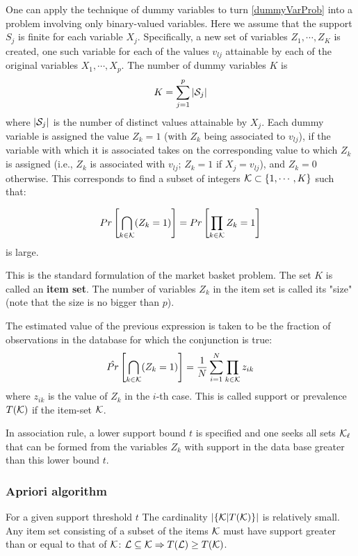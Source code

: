 \documentclass[12pt, letterpaper]{article}
\theoremstyle{definition}
\DeclarePairedDelimiter\autobracket{(}{)}
\newcommand{\br}[1]{\autobracket*{#1}}
\begin{document}
One can apply the technique of dummy variables to turn \autoref{dummyVarProb} into a problem involving only binary-valued variables. Here we assume that the support $S_j$ is finite for each variable $X_j$. Specifically, a new set of variables $Z_1, \cdots, Z_K$ is created, one such variable for each of the values $v_{lj}$ attainable by each of the original variables $X_1, \cdots, X_p$. The number of dummy variables $K$ is
\begin{equation}
K = \sum_{j=1}^p |\CMcal{S}_j|
\end{equation}
where $|\CMcal{S}_j|$ is the number of distinct values attainable by $X_j$.  Each dummy variable is assigned the value $Z_k = 1$ (with $Z_k$ being associated to $v_{lj}$), if the variable with which it is associated takes on the corresponding value to which $Z_k$ is assigned (i.e., $Z_k$ is associated with $v_{lj}$; $Z_k = 1$ if  $X_j=v_{lj}$), and $Z_k = 0$ otherwise. This corresponds to find a subset of integers $\CMcal{K} \subset \{1,\cdots, K\}$ such that:

\begin{equation}
Pr\left[ \bigcap\limits_{k \in \CMcal{K}} \br{Z_k = 1}\right] = Pr\left[ \prod_{k \in \CMcal{K}} Z_k = 1\right]
\end{equation}
is large.

This is the standard formulation of the market basket problem. The set $K$ is called an \textbf{item set}. The number of variables $Z_k$ in the item set is called its "size" (note that the size is no bigger than $p$).

The estimated value of the previous expression is taken to be the fraction of observations in the database for which the conjunction is true:
\begin{equation}
\hat{Pr}\left[ \bigcap\limits_{k \in \CMcal{K}} \br{Z_k = 1}\right] = \frac{1}{N}\sum_{i=1}^N \prod_{k \in \CMcal{K}} z_{ik}
\end{equation}
where $z_{ik}$ is the value of $Z_k$ in the $i$-th case. This is called support or prevalence $T(\CMcal{K})$ if the item-set $\CMcal{K}$.

In association rule, a lower support bound $t$ is specified and one seeks all sets $\CMcal{K}_\ell$ that can be formed from the variables $Z_k$ with support in the data base greater than this lower bound $t$.

\subsubsection{Apriori algorithm}
For a given support threshold $t$ The cardinality $|\{\CMcal{K}| T(\CMcal{K}) \}|$ is relatively small. Any item set consisting of a subset of the items $\CMcal{K}$ must have support greater than or equal to that of  $\CMcal{K}$:  $\CMcal{L} \subseteq \CMcal{K} \Rightarrow T(\CMcal{L})\ge T(\CMcal{K})$.
\end{document}
